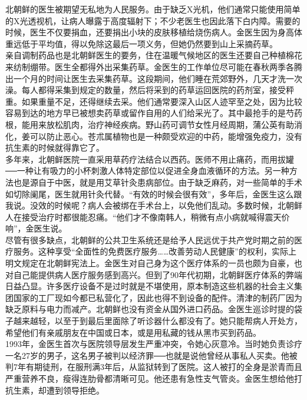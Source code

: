 北朝鲜的医生被期望无私地为人民服务。由于缺乏X光机，他们通常只能使用简单的X光透视机，让病人曝露于高度辐射下；不少老医生也因此落下白内障。需要的时候，医生不仅要捐血，还要捐出小块的皮肤移植给烧伤病人。金医生因为身高体重远低于平均值，得以免除这最后一项义务，但她仍然要到山上采摘药草。\\

亲自调制药品也是北朝鲜医生的要务，住在温暖气候地区的医生还要自己种植棉花来纺制绷带。医生全都得外出采集药草。金医生的工作单位尽可能在春秋两季各腾出一个月的时间让医生去采集药草。这段期间，他们睡在荒郊野外，几天才洗一次澡。每人都得采集到规定的数量，然后将采到的药草运回医院的药剂室，接受秤重。如果重量不足，还得继续去采。他们通常要深入山区人迹罕至之处，因为比较容易到达的地方早已被想卖药草或留作自用的人们给采光了。其中最抢手的是芍药根，能用来放松肌肉，治疗神经疾病。野山药可调节女性月经周期，蒲公英有助消化，姜可以防止恶心。苍朮属植物也是一种颇受欢迎的中药，能增强免疫力，没有抗生素的时候就得靠它了。\\

多年来，北朝鲜医院一直采用草药疗法结合以西药。医师不用止痛药，而用拔罐──一种让有吸力的小杯刺激人体特定部位以促进全身血液循环的方法。另一种方法也是源自于中医，就是用艾草针灸患病部位。由于缺乏麻药，对一些简单的手术如切除阑尾，医生就用针灸代替。“有效的时候会很有效”，多年后，金医生这么跟我说。没效的时候呢？病人会被绑在手术台上，以免他们乱动。多数时候，北朝鲜人在接受治疗时都很能忍痛。“他们才不像南韩人，稍微有点小病就喊得震天价响”，金医生说。\\

尽管有很多缺点，北朝鲜的公共卫生系统还是给予人民远优于共产党时期之前的医疗服务。这种享受“全面性的免费医疗服务……改善劳动人民健康”的权利，实际上明文规定在北朝鲜宪法上。金医生对自己身为这个医疗体系的一员也颇为自豪，也对自己能提供病人医疗服务感到高兴。但到了90年代初期，北朝鲜医疗体系的弊端日益凸显。许多医疗设备不是过时就是不堪使用，原本制造这些机器的社会主义集团国家的工厂现如今都已私营化了，因此也得不到设备的配件。清津的制药厂因为缺乏原料与电力而减产。北朝鲜也没有资金从国外进口药品。金医生巡诊时提的袋子越来越轻，以至于到最后里面除了听诊器什么都没有了。她只能帮病人开处方，希望他们有亲戚朋友在中国或日本，或是用私藏的钱从黑市买到药品。\\

1993年，金医生首次与医院领导层发生严重冲突，令她心灰意冷。当时她负责诊疗一名27岁的男子，这名男子被判以经济罪──也就是说他曾经从事私人买卖。他被判7年有期徒刑，在服刑满3年后，从监狱转到了医院。这人被打的全身是淤青而且严重营养不良，瘦得连肋骨都清晰可见。他还患有急性支气管炎。金医生想给他打抗生素，却遭到领导拒绝。\\

